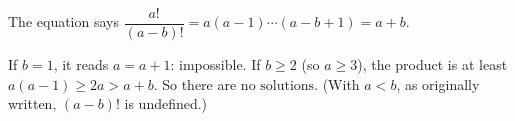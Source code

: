 The equation says $\dfrac{a!}{(a-b)!}=a(a-1)\cdots(a-b+1)=a+b$.

If $b=1$, it reads $a=a+1$: impossible. If $b\ge2$ (so $a\ge3$), the product is at least $a(a-1)\ge2a>a+b$. So there are $\boxed{\text{no solutions}}$. (With $a<b$, as originally written, $(a-b)!$ is undefined.)
